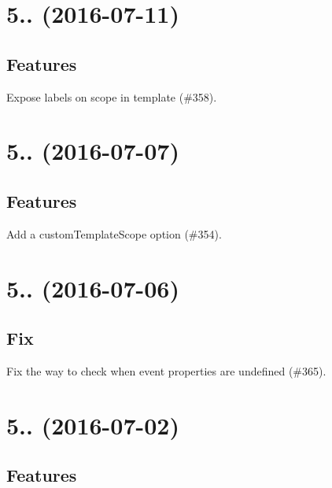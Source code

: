 \section*{5.. (2016-\/07-\/11)}

\subsection*{Features}


\begin{DoxyItemize}
\item Expose labels on scope in template (\#358).
\end{DoxyItemize}

\section*{5.. (2016-\/07-\/07)}

\subsection*{Features}


\begin{DoxyItemize}
\item Add a {\ttfamily custom\+Template\+Scope} option (\#354).
\end{DoxyItemize}

\section*{5.. (2016-\/07-\/06)}

\subsection*{Fix}


\begin{DoxyItemize}
\item Fix the way to check when event properties are undefined (\#365).
\end{DoxyItemize}

\section*{5.. (2016-\/07-\/02)}

\subsection*{Features}


